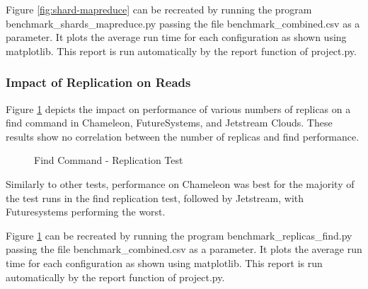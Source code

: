\documentclass[9pt,twocolumn,twoside]{../../styles/osajnl}
\begin{document}
Figure \ref{fig:shard-mapreduce} can be recreated by running the program benchmark\_shards\_mapreduce.py passing the file benchmark\_combined.csv as a parameter.  It plots the average run time for each configuration as shown using matplotlib. This report is run automatically by the report function of project.py.

\subsubsection{Impact of Replication on Reads}



Figure \ref{fig:replica-find} depicts the impact on performance of various numbers of replicas on a find command in Chameleon, FutureSystems, and Jetstream Clouds.  These results show no correlation between the number of replicas and find performance.

\begin{figure}[htbp]
\centering
{}
\caption{Find Command - Replication Test}
\label{fig:replica-find}
\end{figure}

Similarly to other tests, performance on Chameleon was best for the majority of the test runs in the find replication test, followed by Jetstream, with Futuresystems performing the worst.

Figure \ref{fig:replica-find} can be recreated by running the program benchmark\_replicas\_find.py passing the file benchmark\_combined.csv as a parameter.  It plots the average run time for each configuration as shown using matplotlib. This report is run automatically by the report function of project.py.
\end{document}
